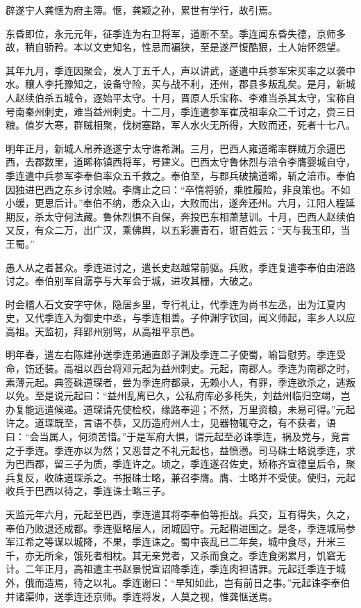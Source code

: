\documentclass[12pt,UTF8]{ctexbook}
\begin{document}
辟遂宁人龚惬为府主簿。惬，龚颖之孙，累世有学行，故引焉。

东昏即位，永元元年，征季连为右卫将军，道断不至。季连闻东昏失德，京师多故，稍自骄矜。本以文吏知名，性忌而褊狭，至是遂严愎酷狠，土人始怀怨望。

其年九月，季连因聚会，发人丁五千人，声以讲武，遂遣中兵参军宋买率之以袭中水。穰人李托豫知之，设备守险，买与战不利，还州，郡县多叛乱矣。是月，新城人赵续伯杀五城令，逐始平太守。十月，晋原人乐宝称、李难当杀其太守，宝称自号南秦州刺史，难当益州刺史。十二月，季连遣参军崔茂祖率众二千讨之，赍三日粮。值岁大寒，群贼相聚，伐树塞路，军人水火无所得，大败而还，死者十七八。

明年正月，新城人帛养逐遂宁太守谯希渊。三月，巴西人雍道晞率群贼万余逼巴西，去郡数里，道晞称镇西将军，号建义。巴西太守鲁休烈与涪令李膺婴城自守，季连遣中兵参军李奉伯率众五千救之。奉伯至，与郡兵破擒道晞，斩之涪市。奉伯因独进巴西之东乡讨余贼。李膺止之曰：“卒惰将骄，乘胜履险，非良策也。不如小缓，更思后计。”奉伯不纳，悉众入山，大败而出，遂奔还州。六月，江阳人程延期反，杀太守何法藏。鲁休烈惧不自保，奔投巴东相萧慧训。十月，巴西人赵续伯又反，有众二万，出广汉，乘佛舆，以五彩裹青石，诳百姓云：“天与我玉印，当王蜀。”

愚人从之者甚众。季连进讨之，遣长史赵越常前驱。兵败，季连复遣李奉伯由涪路讨之。奉伯别军自潺亭与大军会于城，进攻其栅，大破之。

时会稽人石文安字守休，隐居乡里，专行礼让，代季连为尚书左丞，出为江夏内史，又代季连入为御史中丞，与季连相善。子仲渊字钦回，闻义师起，率乡人以应高祖。天监初，拜郢州别驾，从高祖平京邑。

明年春，遣左右陈建孙送季连弟通直郎子渊及季连二子使蜀，喻旨慰劳。季连受命，饬还装。高祖以西台将邓元起为益州刺史。元起，南郡人。季连为南郡之时，素薄元起。典签硃道琛者，尝为季连府都录，无赖小人，有罪，季连欲杀之，逃叛以免。至是说元起曰：“益州乱离已久，公私府库必多秏失，刘益州临归空竭，岂办复能远遣候递。道琛请先使检校，缘路奉迎；不然，万里资粮，未易可得。”元起许之。道琛既至，言语不恭，又历造府州人士，见器物辄夺之，有不获者，语曰：“会当属人，何须苦惜。”于是军府大惧，谓元起至必诛季连，祸及党与，竞言之于季连。季连亦以为然；又恶昔之不礼元起也，益愤懑。司马硃士略说季连，求为巴西郡，留三子为质，季连许之。顷之，季连遂召佐史，矫称齐宣德皇后令，聚兵复反，收硃道琛杀之。书报硃士略，兼召李膺。膺、士略并不受使。使归，元起收兵于巴西以待之，季连诛士略三子。

天监元年六月，元起至巴西，季连遣其将李奉伯等拒战。兵交，互有得失，久之，奉伯乃败退还成都。季连驱略居人，闭城固守。元起稍进围之。是冬，季连城局参军江希之等谋以城降，不果，季连诛之。蜀中丧乱已二年矣，城中食尽，升米三千，亦无所籴，饿死者相枕。其无亲党者，又杀而食之。季连食粥累月，饥窘无计。二年正月，高祖遣主书赵景悦宣诏降季连，季连肉袒请罪。元起迁季连于城外，俄而造焉，待之以礼。季连谢曰：“早知如此，岂有前日之事。”元起诛李奉伯并诸渠帅，送季连还京师。季连将发，人莫之视，惟龚惬送焉。
\end{document}
